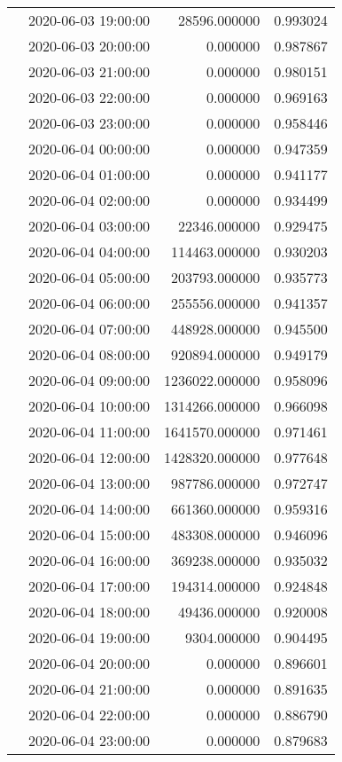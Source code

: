 \begin{tabular}{llrr}
 & 2020-06-03 19:00:00 & 28596.000000 & 0.993024 \\
 & 2020-06-03 20:00:00 & 0.000000 & 0.987867 \\
 & 2020-06-03 21:00:00 & 0.000000 & 0.980151 \\
 & 2020-06-03 22:00:00 & 0.000000 & 0.969163 \\
 & 2020-06-03 23:00:00 & 0.000000 & 0.958446 \\
 & 2020-06-04 00:00:00 & 0.000000 & 0.947359 \\
 & 2020-06-04 01:00:00 & 0.000000 & 0.941177 \\
 & 2020-06-04 02:00:00 & 0.000000 & 0.934499 \\
 & 2020-06-04 03:00:00 & 22346.000000 & 0.929475 \\
 & 2020-06-04 04:00:00 & 114463.000000 & 0.930203 \\
 & 2020-06-04 05:00:00 & 203793.000000 & 0.935773 \\
 & 2020-06-04 06:00:00 & 255556.000000 & 0.941357 \\
 & 2020-06-04 07:00:00 & 448928.000000 & 0.945500 \\
 & 2020-06-04 08:00:00 & 920894.000000 & 0.949179 \\
 & 2020-06-04 09:00:00 & 1236022.000000 & 0.958096 \\
 & 2020-06-04 10:00:00 & 1314266.000000 & 0.966098 \\
 & 2020-06-04 11:00:00 & 1641570.000000 & 0.971461 \\
 & 2020-06-04 12:00:00 & 1428320.000000 & 0.977648 \\
 & 2020-06-04 13:00:00 & 987786.000000 & 0.972747 \\
 & 2020-06-04 14:00:00 & 661360.000000 & 0.959316 \\
 & 2020-06-04 15:00:00 & 483308.000000 & 0.946096 \\
 & 2020-06-04 16:00:00 & 369238.000000 & 0.935032 \\
 & 2020-06-04 17:00:00 & 194314.000000 & 0.924848 \\
 & 2020-06-04 18:00:00 & 49436.000000 & 0.920008 \\
 & 2020-06-04 19:00:00 & 9304.000000 & 0.904495 \\
 & 2020-06-04 20:00:00 & 0.000000 & 0.896601 \\
 & 2020-06-04 21:00:00 & 0.000000 & 0.891635 \\
 & 2020-06-04 22:00:00 & 0.000000 & 0.886790 \\
 & 2020-06-04 23:00:00 & 0.000000 & 0.879683 \\

\end{tabular}
